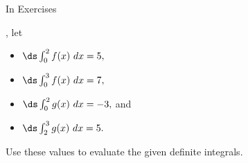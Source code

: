 {\noindent In Exercises }
{, let
\begin{itemize}
\item $\ds \int_0^2 f(x)\ dx = 5,$
\item $\ds \int_0^3 f(x) \ dx=7,$
\item $\ds \int_0^2 g(x)\ dx = -3,$ and
\item $\ds \int_2^3 g(x)\ dx = 5.$
\end{itemize}
Use these values to evaluate the given definite integrals.}
